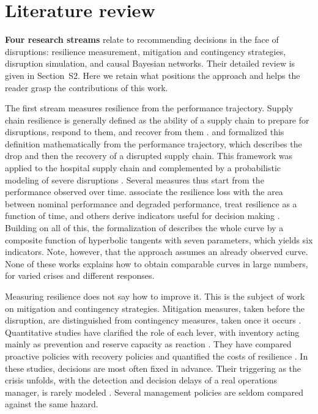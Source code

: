 \section{Literature review}
\label{sec:etat}

\textbf{Four research streams} relate to recommending decisions in the face of disruptions: resilience measurement, mitigation and contingency strategies, disruption simulation, and causal Bayesian networks. Their detailed review is given in Section~S2. Here we retain what positions the approach and helps the reader grasp the contributions of this work.

The first stream measures resilience from the performance trajectory. Supply chain resilience is generally defined as the ability of a supply chain to prepare for disruptions, respond to them, and recover from them \citep{tukamuhabwa2015, kamalahmadi2016}. \citet{rahiel2026in4pl} and \citet{rahiel2026these} formalized this definition mathematically from the performance trajectory, which describes the drop and then the recovery of a disrupted supply chain. This framework was applied to the hospital supply chain \citep{rahiel2025esd} and complemented by a probabilistic modeling of severe disruptions \citep{rahiel2026codit}. Several measures thus start from the performance observed over time. \citet{bruneau2003} associate the resilience loss with the area between nominal performance and degraded performance, \citet{henry2012} treat resilience as a function of time, and others derive indicators useful for decision making \citep{spiegler2012, behzadi2020}. Building on all of this, the formalization of \citet{rahiel2026in4pl} describes the whole curve by a composite function of hyperbolic tangents with seven parameters, which yields six indicators. Note, however, that the approach assumes an already observed curve. None of these works explains how to obtain comparable curves in large numbers, for varied crises and different responses.

Measuring resilience does not say how to improve it. This is the subject of work on mitigation and contingency strategies. Mitigation measures, taken before the disruption, are distinguished from contingency measures, taken once it occurs \citep{tang2006, tomlin2006}. Quantitative studies have clarified the role of each lever, with inventory acting mainly as prevention and reserve capacity as reaction \citep{lucker2019}. They have compared proactive policies with recovery policies \citep{ivanov2016tre} and quantified the costs of resilience \citep{aldrighetti2021}. In these studies, decisions are most often fixed in advance. Their triggering as the crisis unfolds, with the detection and decision delays of a real operations manager, is rarely modeled \citep{klibi2012ijpe}. Several management policies are seldom compared against the same hazard.


